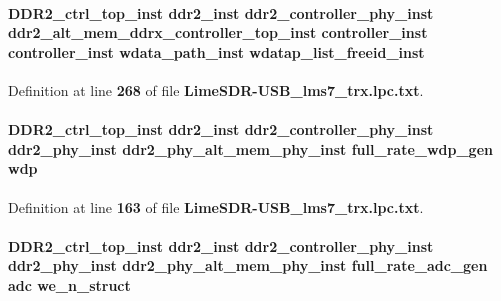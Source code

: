 \paragraph[{wdatap\+\_\+list\+\_\+freeid\+\_\+inst}]{ {\bf D\+D\+R2\+\_\+ctrl\+\_\+top\+\_\+inst} {\bf ddr2\+\_\+inst} {\bf ddr2\+\_\+controller\+\_\+phy\+\_\+inst} {\bf ddr2\+\_\+alt\+\_\+mem\+\_\+ddrx\+\_\+controller\+\_\+top\+\_\+inst} {\bf controller\+\_\+inst} {\bf controller\+\_\+inst} {\bf wdata\+\_\+path\+\_\+inst} wdatap\+\_\+list\+\_\+freeid\+\_\+inst}\label{LimeSDR-USB__lms7__trx_8lpc_8txt_ab06e2083d6797fba356f6407ad6fe7ae}


Definition at line {\bf 268} of file {\bf Lime\+S\+D\+R-\/\+U\+S\+B\+\_\+lms7\+\_\+trx.\+lpc.\+txt}.

\paragraph[{wdp}]{ {\bf D\+D\+R2\+\_\+ctrl\+\_\+top\+\_\+inst} {\bf ddr2\+\_\+inst} {\bf ddr2\+\_\+controller\+\_\+phy\+\_\+inst} {\bf ddr2\+\_\+phy\+\_\+inst} {\bf ddr2\+\_\+phy\+\_\+alt\+\_\+mem\+\_\+phy\+\_\+inst} full\+\_\+rate\+\_\+wdp\+\_\+gen wdp}\label{LimeSDR-USB__lms7__trx_8lpc_8txt_a61a1c2568c37bb0e53b440d1feae38e9}


Definition at line {\bf 163} of file {\bf Lime\+S\+D\+R-\/\+U\+S\+B\+\_\+lms7\+\_\+trx.\+lpc.\+txt}.

\paragraph[{we\+\_\+n\+\_\+struct}]{ {\bf D\+D\+R2\+\_\+ctrl\+\_\+top\+\_\+inst} {\bf ddr2\+\_\+inst} {\bf ddr2\+\_\+controller\+\_\+phy\+\_\+inst} {\bf ddr2\+\_\+phy\+\_\+inst} {\bf ddr2\+\_\+phy\+\_\+alt\+\_\+mem\+\_\+phy\+\_\+inst} full\+\_\+rate\+\_\+adc\+\_\+gen {\bf adc} we\+\_\+n\+\_\+struct}\label{LimeSDR-USB__lms7__trx_8lpc_8txt_a5637e1a3d722533ac7d97b391610d517}


